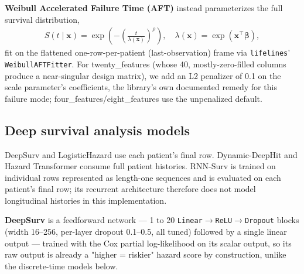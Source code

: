 \textbf{Weibull Accelerated Failure Time (AFT)} \citep{anderson1991nonproportional_weibull} instead parameterizes the full survival distribution,
\begin{align}
S(t\mid\boldsymbol{x}) = \exp\!\left(-\left(\frac{t}{\lambda(\boldsymbol{x})}\right)^{\rho}\right), \quad \lambda(\boldsymbol{x}) = \exp(\boldsymbol{x}^\intercal\boldsymbol{\beta}),
\end{align}
fit on the flattened one-row-per-patient (last-observation) frame via \texttt{lifelines}' \texttt{WeibullAFTFitter}. For twenty\_features (whose 40, mostly-zero-filled columns produce a near-singular design matrix), we add an L2 penalizer of 0.1 on the scale parameter's coefficients, the library's own documented remedy for this failure mode; four\_features/eight\_features use the unpenalized default.

\subsection{Deep survival analysis models}
DeepSurv and LogisticHazard use each patient's final row. Dynamic-DeepHit and Hazard Transformer consume full patient histories. RNN-Surv is trained on individual rows represented as length-one sequences and is evaluated on each patient's final row; its recurrent architecture therefore does not model longitudinal histories in this implementation.

\textbf{DeepSurv} \citep{katzman2018deepsurv} is a feedforward network — 1 to 20 \texttt{Linear}$\to$\texttt{ReLU}$\to$\texttt{Dropout} blocks (width 16--256, per-layer dropout 0.1--0.5, all tuned) followed by a single linear output — trained with the Cox partial log-likelihood on its scalar output, so its raw output is already a "higher = riskier" hazard score by construction, unlike the discrete-time models below.

